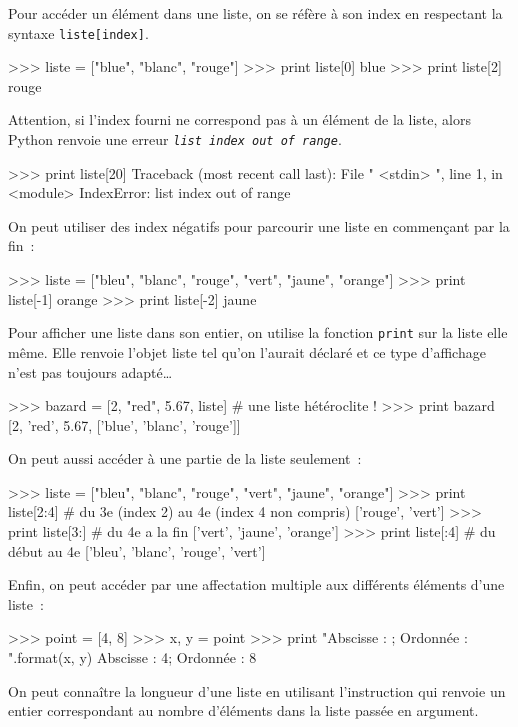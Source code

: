  Pour accéder un élément dans une liste, on se réfère à son index en respectant la syntaxe
 \texttt{liste[index]}.
 \begin{pythoncode}
 >>> liste = ["blue", "blanc", "rouge"]
>>> print liste[0]
blue
>>> print liste[2]
rouge
 \end{pythoncode}
Attention, si l'index fourni ne correspond pas à un élément de la liste, alors Python renvoie une erreur \texttt{\itshape list index out of range}.
\begin{pythoncode}
>>> print liste[20]
Traceback (most recent call last):
  File " <stdin> ", line 1, in <module>
IndexError: list index out of range
 \end{pythoncode}

On peut utiliser des index négatifs pour parcourir une liste en commençant par la fin~:
\begin{pythoncode}
>>> liste = ["bleu", "blanc", "rouge", "vert", "jaune", "orange"]
>>> print liste[-1]
orange
>>> print liste[-2]
jaune
 \end{pythoncode}

Pour afficher une liste dans son entier, on utilise la fonction \texttt{print} sur la liste elle même. Elle renvoie l'objet liste tel qu'on l'aurait déclaré et ce type d'affichage n'est pas toujours adapté\dots

\begin{pythoncode}
>>> bazard = [2, "red", 5.67, liste]         # une liste hétéroclite !
>>> print bazard
[2, 'red', 5.67, ['blue', 'blanc', 'rouge']]
\end{pythoncode}

On peut aussi accéder à une partie de la liste seulement~:

\begin{pythoncode}
>>> liste = ["bleu", "blanc", "rouge", "vert", "jaune", "orange"]
>>> print liste[2:4]       # du 3e (index 2) au 4e (index 4 non compris)
['rouge', 'vert']
>>> print liste[3:]        # du 4e a la fin
['vert', 'jaune', 'orange']
>>> print liste[:4]        # du début au 4e
['bleu', 'blanc', 'rouge', 'vert']
\end{pythoncode}


Enfin, on peut accéder par une affectation multiple aux différents éléments d'une liste~:
\begin{pythoncode}
>>> point = [4, 8]
>>> x, y = point
>>> print "Abscisse : {}; Ordonnée : {}".format(x, y)
Abscisse : 4; Ordonnée : 8
\end{pythoncode}

On peut connaître la longueur d'une liste en utilisant l'instruction  qui renvoie un entier correspondant au nombre d'éléments dans la liste passée en argument.

